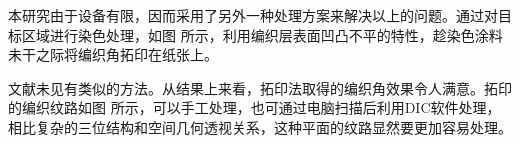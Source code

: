 \begin{figure}[!htb]
	\centering
	\hspace{1cm}
	\label{fig:dic}
\end{figure}

本研究由于设备有限，因而采用了另外一种处理方案来解决以上的问题。通过对目标区域进行染色处理，如图 所示，利用编织层表面凹凸不平的特性，趁染色涂料未干之际将编织角拓印在纸张上。

文献未见有类似的方法。从结果上来看，拓印法取得的编织角效果令人满意。拓印的编织纹路如图 所示，可以手工处理，也可通过电脑扫描后利用DIC软件处理，相比复杂的三位结构和空间几何透视关系，这种平面的纹路显然要更加容易处理。













